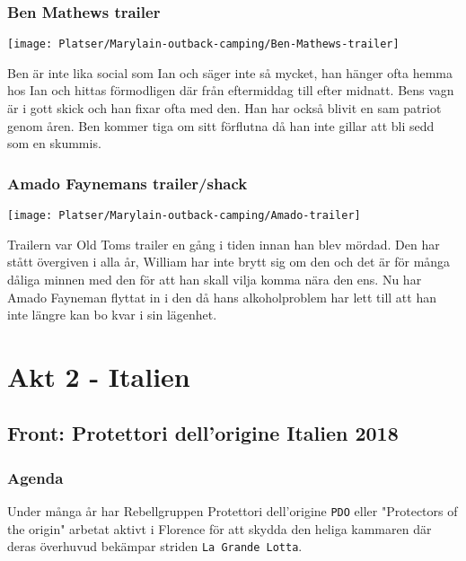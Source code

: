\documentclass[a5paper,10pt]{report}
\begin{document}
\subsection{Ben Mathews trailer}
\texttt{[image: Platser/Marylain-outback-camping/Ben-Mathews-trailer]}

Ben är inte lika social som Ian och säger inte så mycket, han hänger ofta hemma hos Ian och hittas förmodligen där från eftermiddag till efter midnatt. Bens vagn är i gott skick och han fixar ofta med den. Han har också blivit en sam patriot genom åren. Ben kommer tiga om sitt förflutna då han inte gillar att bli sedd som en skummis.
\clearpage
\subsection{Amado Faynemans trailer/shack}
\texttt{[image: Platser/Marylain-outback-camping/Amado-trailer]}

Trailern var Old Toms trailer en gång i tiden innan han blev mördad. Den har stått övergiven i alla år, William har inte brytt sig om den och det är för många dåliga minnen med den för att han skall vilja komma nära den ens. Nu har Amado Fayneman flyttat in i den då hans alkoholproblem har lett till att han inte längre kan bo kvar i sin lägenhet.
\chapter{Akt 2 - Italien}
\section{Front: Protettori dell'origine Italien 2018}
\subsection{Agenda}
Under många år har Rebellgruppen Protettori dell'origine \texttt{PDO} eller "Protectors of the origin" arbetat aktivt i Florence för att skydda den heliga kammaren där deras överhuvud bekämpar striden \texttt{La Grande Lotta}.
\end{document}
